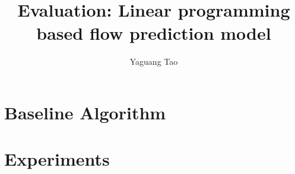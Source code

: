 \documentclass{report}
\title{Evaluation: Linear programming based flow prediction model}
\author{Yaguang Tao}
\begin{document}
\maketitle
\section{Baseline Algorithm} %
\label{sec:baseline_algorithm}

\section{Experiments} %
\label{sec:experiments}

\end{document}

